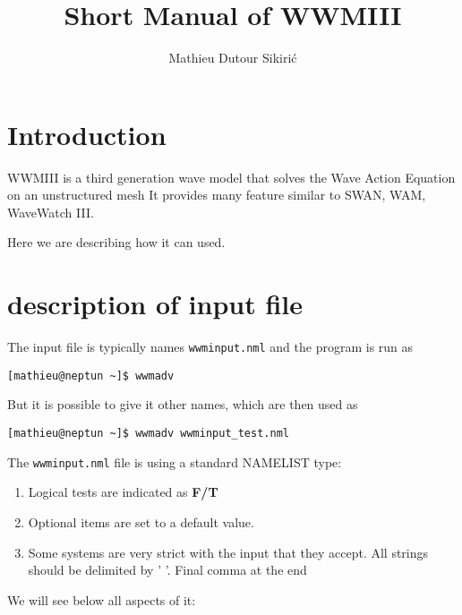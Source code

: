 \documentclass[12pt]{amsart}
\begin{document}
\author{Mathieu Dutour Sikiri\'c}
\address{Mathieu Dutour Sikiri\'c, Rudjer Boskovi\'c Institute, Bijenicka 54, 10000 Zagreb, Croatia}


\title{Short Manual of WWMIII}
\date{}

\maketitle


\section{Introduction}
WWMIII is a third generation wave model that solves the Wave Action Equation on an unstructured mesh
It provides many feature similar to SWAN, WAM, WaveWatch III.

Here we are describing how it can used.

\section{description of input file}
The input file is typically names {\tt wwminput.nml} and the program is run as
\begin{verbatim}
[mathieu@neptun ~]$ wwmadv
\end{verbatim}
But it is possible to give it other names, which are then used as
\begin{verbatim}
[mathieu@neptun ~]$ wwmadv wwminput_test.nml
\end{verbatim}
The {\tt wwminput.nml} file is using a standard NAMELIST type:
\begin{enumerate}
\item Logical tests are indicated as {\bf F/T}
\item Optional items are set to a default value.
\item Some systems are very strict with the input that they accept. All strings should be delimited by '   '. Final comma at the end 
\end{enumerate}
We will see below all aspects of it:
\end{document}
